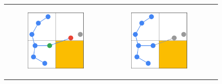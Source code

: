 \begin{figure}[H]
\begin{centering}
\begin{tabular}{ccc}
    \begin{subfigure}{0.3\linewidth}
    \includegraphics[width=\linewidth]{chapters/chapter2/img/keyfunctions/functions5.png}
    \caption{}
    \end{subfigure} & 

    \begin{subfigure}{0.3\linewidth}
    \includegraphics[width=\linewidth]{chapters/chapter2/img/keyfunctions/functions6.png}
    \caption{}
    \end{subfigure} \\

\end{tabular}
\caption{}
\label{fig:rrt_functions}
\end{centering}
\end{figure}